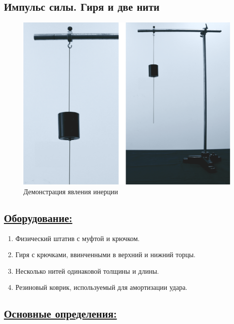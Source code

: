 \documentclass[14pt,a4paper,oneside]{extarticle}	%
\begin{document}

\begin{center}
	\subsection*{Импульс силы. Гиря и две нити}
\end{center}

\begin{figure}[H] 	%
	\centering 		%
	\includegraphics[width=0.9\linewidth]{inertia-2.png}
	\caption{Демонстрация явления инерции}
\end{figure}

\subsection*{\underline{Оборудование:}}

\begin{enumerate}
	\item Физический штатив с муфтой и крючком.
	\item Гиря с крючками, ввинченными в верхний и нижний торцы.
	\item Несколько нитей одинаковой толщины и длины.
	\item Резиновый коврик, используемый для амортизации удара.
\end{enumerate}

\newpage
\subsection*{\underline{Основные определения:}}
\end{document}
